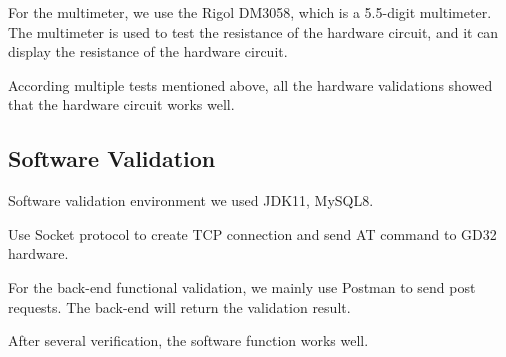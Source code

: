 \documentclass[11pt, a4paper]{article}
\begin{document}
For the multimeter, we use the Rigol DM3058, which is a 5.5-digit multimeter.
The multimeter is used to test the resistance of the hardware circuit, and it can display the resistance of the hardware circuit.

According multiple tests mentioned above, all the hardware validations showed that the hardware circuit works well.
\subsection{Software Validation}
Software validation environment we used JDK11, MySQL8.

Use Socket protocol to create TCP connection and send AT command to GD32 hardware.

For the back-end functional validation, we mainly use Postman to send post requests. The back-end will return the validation result.

After several verification, the software function works well.
\end{document}
